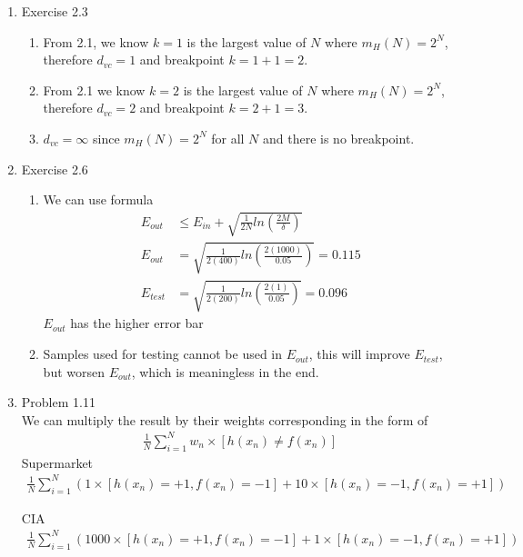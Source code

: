 \documentclass{article}
\begin{document}
\begin{enumerate}
        \item Exercise 2.3
        \begin{enumerate}[label=(\alph*)]
            \item From 2.1, we know $k = 1$ is the largest value of $N$ where $m_H(N) = 2^N$, therefore $d_{vc} = 1$ and breakpoint $k = 1+ 1=2$.
            \item From 2.1 we know $k = 2$ is the largest value of $N$ where $m_H(N) = 2^N$, therefore $d_{vc} = 2$ and breakpoint $k = 2 + 1 = 3$.
            \item $d_{vc} = \infty$ since $m_H(N) = 2^N$ for all $N$ and there is no breakpoint.
        \end{enumerate}

        \item Exercise 2.6
        \begin{enumerate}[label=(\alph*)]
            \item We can use formula
            \begin{align*}
                E_{out} &\leq E_{in} + \sqrt{\frac{1}{2N}ln(\frac{2M}{\delta})}\\
                E_{out} &= \sqrt{\frac{1}{2(400)}ln(\frac{2(1000)}{0.05})} = 0.115\\
                E_{test} &= \sqrt{\frac{1}{2(200)}ln(\frac{2(1)}{0.05})} = 0.096
            \end{align*}
            $E_{out}$ has the higher error bar
            
            \item Samples used for testing cannot be used in $E_{out}$, this will improve $E_{test}$, but worsen $E_{out}$, which is meaningless in the end.
        \end{enumerate}

        \item Problem 1.11\\
        We can multiply the result by their weights corresponding in the form of 
        \begin{align*}
            \frac{1}{N}\sum_{i = 1}^{N}w_n \times [h(x_n) \neq f(x_n)]
        \end{align*}
        Supermarket
        \begin{align*}
            \frac{1}{N}\sum_{i = 1}^{N}(1 \times [h(x_n) = +1, f(x_n) = -1] + 10 \times [h(x_n) = -1, f(x_n) = +1])
        \end{align*}

        CIA
        \begin{align*}
            \frac{1}{N}\sum_{i = 1}^{N}(1000 \times [h(x_n) = +1, f(x_n) = -1] + 1 \times [h(x_n) = -1, f(x_n) = +1])
        \end{align*}


\end{enumerate}
\end{document}
